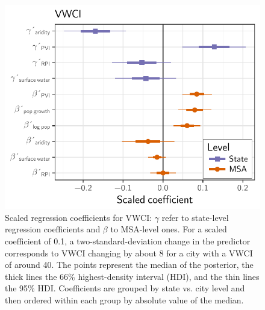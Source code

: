 \documentclass[draft,linenumbers]{agujournal}\usepackage{knitr}
\begin{document}
\begin{figure}[tb]

{\centering \includegraphics[width=0.8\linewidth]{figure/vwci_cat_plot-1}

}

\caption[Scaled regression coefficients for VWCI]{Scaled regression coefficients for VWCI: $\gamma$ refer to state-level regression coefficients and $\beta$ to MSA-level ones.
For a scaled coefficient of 0.1, a two-standard-deviation change in the predictor corresponds to VWCI changing by about 8 for a city with a VWCI of around 40. The points represent the median of the posterior, the thick lines the 66\% highest-density interval (HDI), and the thin lines the 95\% HDI. Coefficients are grouped by state vs. city level and then ordered within each group by absolute value of the median.}\label{fig:vwci_cat_plot}
\end{figure}


%
%
\end{document}
